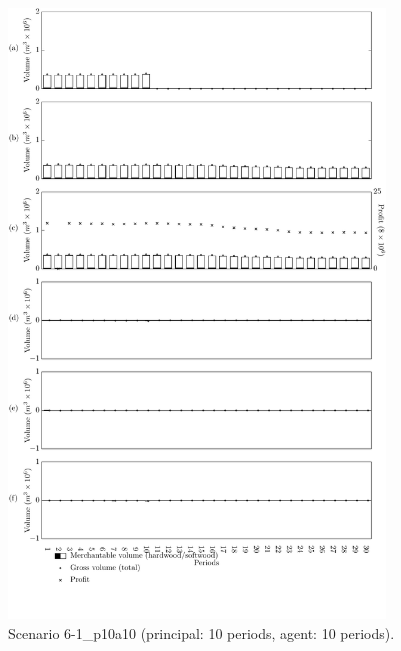 \begin{figure}[h]
  \centering
  \includegraphics[width=10cm]{images/appendix/s6-1_p10a10}
  \caption{Scenario 6-1\_p10a10 (principal: 10 periods, agent: 10 periods).}
  \label{fig:s6-1_p10a10}
\end{figure}

